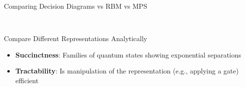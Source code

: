 \begin{frame}{Comparing Decision Diagrams vs RBM vs MPS}

\vspace{-.5em}
\centering

~

\pause

\begin{block}{Compare Different Representations Analytically}
	\begin{itemize}\vspace{-.5em}
		\item \textbf{Succinctness}: Families of quantum states showing exponential separations
		\item \textbf{Tractability}: Is manipulation of the representation (e.g., applying a gate) efficient
	\end{itemize}\vspace{-.5em}
\end{block}

\end{frame}




